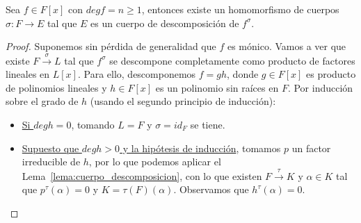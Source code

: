 \begin{prop}\label{prop:existe_cdd}
    Sea $f\in F[x]$ con $degf = n \geq 1$, entonces existe un homomorfismo de cuerpos $\sigma:F\to E$ tal que $E$ es un cuerpo de descomposición de $f^{\sigma}$.
    \begin{proof}
        Suponemos sin pérdida de generalidad que $f$ es mónico. Vamos a ver que existe $F\stackrel{\sigma}{\to}L$ tal que $f^\sigma$ se descompone completamente como producto de factores lineales en $L[x]$. Para ello, descomponemos $f=gh$, donde $g\in F[x]$ es producto de polinomios lineales y $h\in F[x]$ es un polinomio sin raíces en $F$. Por inducción sobre el grado de $h$ (usando el segundo principio de inducción):
        \begin{itemize}
            \item \underline{Si $deg h = 0$}, tomando $L = F$ y $\sigma = id_F$ se tiene.
            \item \underline{Supuesto que $degh>0$ y la hipótesis de inducción}, tomamos $p$ un factor irreducible de $h$, por lo que podemos aplicar el Lema~\ref{lema:cuerpo_descomposicion}, con lo que existen $F\stackrel{\tau}{\to}K$ y $\alpha\in K$ tal que $p^\tau(\alpha)=0$ y $K = \tau(F)(\alpha)$. Observamos que $h^\tau(\alpha)=0$.


\end{itemize}
\end{proof}
\end{prop}
